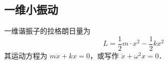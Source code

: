 

\subsection{一维小振动}
一维谐振子的拉格朗日量为
\begin{equation}
L=\frac{1}{2}m\cdot{x}^2-\frac{1}{2}kx^2
\end{equation}
其运动方程为 $m\ddot {x}+kx=0$，或写作 $\ddot{x}+\omega^2 x=0$．